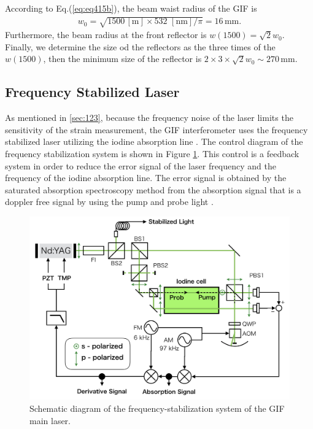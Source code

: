 According to Eq.(\ref{eq:eq415b}), the beam waist radius of the GIF is
\begin{eqnarray}
  w_0=\sqrt{{1500\,\mathrm{[m]}}\times 532\,\,\mathrm{[nm]}/\pi} = 16\,\mathrm{mm}.
\end{eqnarray}
Furthermore, the beam radius at the front reflector is $w(1500)=\sqrt{2}{w_0}$. Finally, we determine the size od the reflectors as the three times of the $w(1500)$, then the minimum size of the reflector is $2\times3\times\sqrt{2}w_0\sim270\,\mathrm{mm}$.


\subsection{Frequency Stabilized Laser} \label{sec:sec135}
As mentioned in \cref{sec:123}, because the frequency noise of the laser limits the sensitivity of the strain measurement, the GIF interferometer uses the frequency stabilized laser utilizing the iodine absorption line \cite{araya2002iodine}. The control diagram of the frequency stabilization system is shown in Figure \ref{img:img417}. This control is a feedback system in order to reduce the error signal of the laser frequency and the frequency of the iodine absorption line. The error signal is obtained by the saturated absorption spectroscopy method from the absorption signal that is a doppler free signal by using the pump and probe light \cite{snyder1980high}.
\begin{figure}[h]
  \begin{center}   
    \includegraphics[width=12cm]{./img_chap4/img417.png}
    \caption{Schematic diagram of the frequency-stabilization system of the GIF main laser.}\label{img:img417}
  \end{center}
\end{figure}


